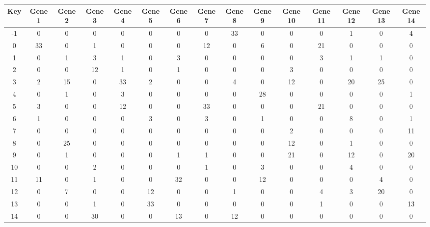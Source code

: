 \begin{tabular}{|c|c|c|c|c|c|c|c|c|c|c|c|c|c|c|}
\hline
Key & Gene 1 & Gene 2 & Gene 3 & Gene 4 & Gene 5 & Gene 6 & Gene 7 & Gene 8 & Gene 9 & Gene 10 & Gene 11 & Gene 12 & Gene 13 & Gene 14 \\
\hline
-1 & 0 & 0 & 0 & 0 & 0 & 0 & 0 & 33 & 0 & 0 & 0 & 1 & 0 & 4 \\
0 & 33 & 0 & 1 & 0 & 0 & 0 & 12 & 0 & 6 & 0 & 21 & 0 & 0 & 0 \\
1 & 0 & 1 & 3 & 1 & 0 & 3 & 0 & 0 & 0 & 0 & 3 & 1 & 1 & 0 \\
2 & 0 & 0 & 12 & 1 & 0 & 1 & 0 & 0 & 0 & 3 & 0 & 0 & 0 & 0 \\
3 & 2 & 15 & 0 & 33 & 2 & 0 & 0 & 4 & 0 & 12 & 0 & 20 & 25 & 0 \\
4 & 0 & 1 & 0 & 3 & 0 & 0 & 0 & 0 & 28 & 0 & 0 & 0 & 0 & 1 \\
5 & 3 & 0 & 0 & 12 & 0 & 0 & 33 & 0 & 0 & 0 & 21 & 0 & 0 & 0 \\
6 & 1 & 0 & 0 & 0 & 3 & 0 & 3 & 0 & 1 & 0 & 0 & 8 & 0 & 1 \\
7 & 0 & 0 & 0 & 0 & 0 & 0 & 0 & 0 & 0 & 2 & 0 & 0 & 0 & 11 \\
8 & 0 & 25 & 0 & 0 & 0 & 0 & 0 & 0 & 0 & 12 & 0 & 1 & 0 & 0 \\
9 & 0 & 1 & 0 & 0 & 0 & 1 & 1 & 0 & 0 & 21 & 0 & 12 & 0 & 20 \\
10 & 0 & 0 & 2 & 0 & 0 & 0 & 1 & 0 & 3 & 0 & 0 & 4 & 0 & 0 \\
11 & 11 & 0 & 1 & 0 & 0 & 32 & 0 & 0 & 12 & 0 & 0 & 0 & 4 & 0 \\
12 & 0 & 7 & 0 & 0 & 12 & 0 & 0 & 1 & 0 & 0 & 4 & 3 & 20 & 0 \\
13 & 0 & 0 & 1 & 0 & 33 & 0 & 0 & 0 & 0 & 0 & 1 & 0 & 0 & 13 \\
14 & 0 & 0 & 30 & 0 & 0 & 13 & 0 & 12 & 0 & 0 & 0 & 0 & 0 & 0 \\
\hline
\end{tabular}
